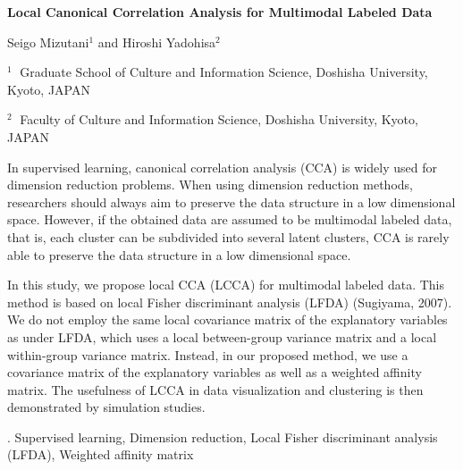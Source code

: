 \documentclass[12pt]{article}
\begin{document}
\begin{flushleft}


 {\LARGE\bf Local Canonical Correlation Analysis for Multimodal Labeled Data}


\vspace{1.0cm}

Seigo Mizutani$^1$ and Hiroshi Yadohisa$^2$

\begin{description}

\item $^1 \;$ Graduate School of Culture and Information Science, Doshisha University, Kyoto, JAPAN			
\item	$^2 \;$ Faculty of Culture and Information Science, Doshisha University, Kyoto, JAPAN	

\end{description}

\end{flushleft}


\vspace{0.75cm}


In supervised learning, canonical correlation analysis (CCA) is widely used for dimension reduction problems. When using dimension reduction methods, researchers should always aim to preserve the data structure in a low dimensional space. However, if the obtained data are assumed to be multimodal labeled data, that is, each cluster can be subdivided into several latent clusters, CCA is rarely able to preserve the data structure in a low dimensional space. 

In this study, we propose local CCA (LCCA) for multimodal labeled data. This method is based on local Fisher discriminant analysis (LFDA) (Sugiyama, 2007). We do not employ the same local covariance matrix of the explanatory variables as under LFDA, which uses a local between-group variance matrix and a local within-group variance matrix. Instead, in our proposed method, we use a covariance matrix of the explanatory variables as well as a weighted affinity matrix. The usefulness of LCCA in data visualization and clustering is then demonstrated by simulation studies.

\vskip 2mm

. Supervised learning, Dimension reduction, Local Fisher discriminant analysis (LFDA), Weighted affinity matrix
\end{document}
